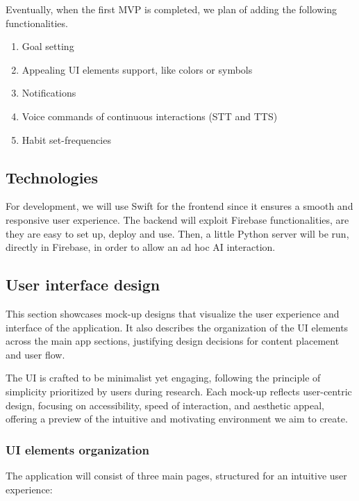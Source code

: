 \documentclass{article}
\begin{document}
Eventually, when the first MVP is completed, we plan of adding the following functionalities.

\begin{enumerate}
    \item Goal setting
    \item Appealing UI elements support, like colors or symbols
    \item Notifications
    \item Voice commands of continuous interactions (STT and TTS)
    \item Habit set-frequencies
\end{enumerate}

\subsection{Technologies}

For development, we will use Swift for the frontend since it ensures a smooth and responsive user experience.
The backend will exploit Firebase functionalities, are they are easy to set up, deploy and use.
Then, a little Python server will be run, directly in Firebase, in order to allow an ad hoc AI interaction.

\subsection{User interface design}

This section showcases mock-up designs that visualize the user experience and interface of the application.
It also describes the organization of the UI elements across the main app sections, justifying design decisions for content placement and user flow.

The UI is crafted to be minimalist yet engaging, following the principle of simplicity prioritized by users during research.
Each mock-up reflects user-centric design, focusing on accessibility, speed of interaction, and aesthetic appeal, offering a preview of the intuitive and motivating environment we aim to create.

\subsubsection{UI elements organization}

The application will consist of three main pages, structured for an intuitive user experience:
\end{document}
